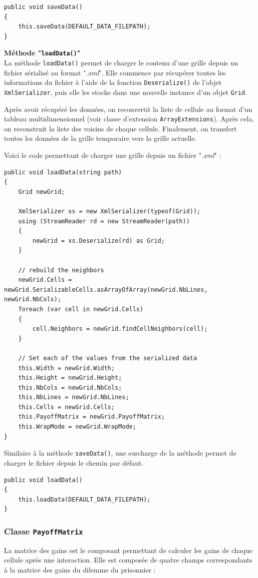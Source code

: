 \documentclass[a4paper, french]{article}
\begin{document}
\begin{lstlisting}
public void saveData()
{
    this.saveData(DEFAULT_DATA_FILEPATH);
}
\end{lstlisting}

\pagebreak
\textbf{Méthode "\texttt{loadData()}"}\\
La méthode \texttt{loadData()} permet de charger le contenu d'une grille depuis un fichier sérialisé au format "\textit{.xml}". Elle commence par récupérer toutes les informations du fichier à l'aide de la fonction \texttt{Deserialize()} de l'objet \texttt{XmlSerializer}, puis elle les stocke dans une nouvelle instance d'un objet \texttt{Grid}.

Après avoir récupéré les données, on reconvertit la liste de cellule au format d'un tableau multidimensionnel (voir classe d'extension \texttt{ArrayExtensions}). Après cela, on reconstruit la liste des voisins de chaque cellule. Finalement, on transfert toutes les données de la grille temporaire vers la grille actuelle.

Voici le code permettant de charger une grille depuis un fichier "\textit{.xml}" :
\begin{lstlisting}
public void loadData(string path)
{
    Grid newGrid;

    XmlSerializer xs = new XmlSerializer(typeof(Grid));
    using (StreamReader rd = new StreamReader(path))
    {
        newGrid = xs.Deserialize(rd) as Grid;
    }

    // rebuild the neighbors
    newGrid.Cells = newGrid.SerializableCells.asArrayOfArray(newGrid.NbLines, newGrid.NbCols);
    foreach (var cell in newGrid.Cells)
    {
        cell.Neighbors = newGrid.findCellNeighbors(cell);
    }

    // Set each of the values from the serialized data
    this.Width = newGrid.Width;
    this.Height = newGrid.Height;
    this.NbCols = newGrid.NbCols;
    this.NbLines = newGrid.NbLines;
    this.Cells = newGrid.Cells;
    this.PayoffMatrix = newGrid.PayoffMatrix;
    this.WrapMode = newGrid.WrapMode;
}
\end{lstlisting}

Similaire à la méthode \texttt{saveData()}, une surcharge de la méthode permet de charger le fichier depuis le chemin par défaut.

\begin{lstlisting}
public void loadData()
{
    this.loadData(DEFAULT_DATA_FILEPATH);
}
\end{lstlisting}
\pagebreak
\subsubsection{Classe \texttt{PayoffMatrix}}
La matrice des gains est le composant permettant de calculer les gains de chaque cellule après une interaction. Elle est composée de quatre champs correspondants à la matrice des gains du dilemme du prisonnier :
\end{document}
